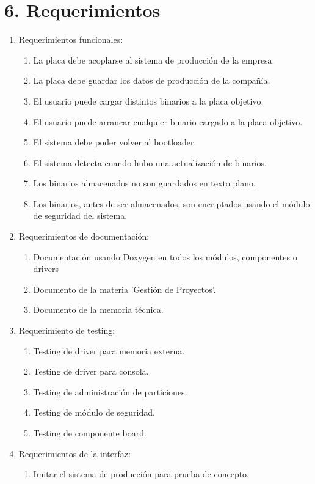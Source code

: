 \documentclass[
11pt, %
]{charter}
\begin{document}
\section{6. Requerimientos}
\label{sec:requerimientos}

\begin{enumerate}
	\item Requerimientos funcionales:
		\begin{enumerate}
			
			\item La placa debe acoplarse al sistema de producción de la empresa.
			\item La placa debe guardar los datos de producción de la compañía.
			\item El usuario puede cargar distintos binarios a la placa objetivo.
			\item El usuario puede arrancar cualquier binario cargado a la placa objetivo.
			\item El sistema debe poder volver al bootloader.
			\item El sistema detecta cuando hubo una actualización de binarios.
			\item Los binarios almacenados no son guardados en texto plano.
			\item Los binarios, antes de ser almacenados, son encriptados usando el módulo de seguridad del sistema.
		\end{enumerate}
	\item Requerimientos de documentación:
		\begin{enumerate}
			\item Documentación usando Doxygen en todos los módulos, componentes o drivers
			\item Documento de la materia 'Gestión de Proyectos'.
			\item Documento de la memoria técnica.
		\end{enumerate}
	\item Requerimiento de testing:
		\begin{enumerate}
			\item Testing de driver para memoria externa.
			\item Testing de driver para consola.
			\item Testing de administración de particiones.
			\item Testing de módulo de seguridad.
			\item Testing de componente board.
		\end{enumerate}
	\item Requerimientos de la interfaz:
		\begin{enumerate}
			\item Imitar el sistema de producción para prueba de concepto.
		\end{enumerate}
\end{enumerate}
\end{document}
